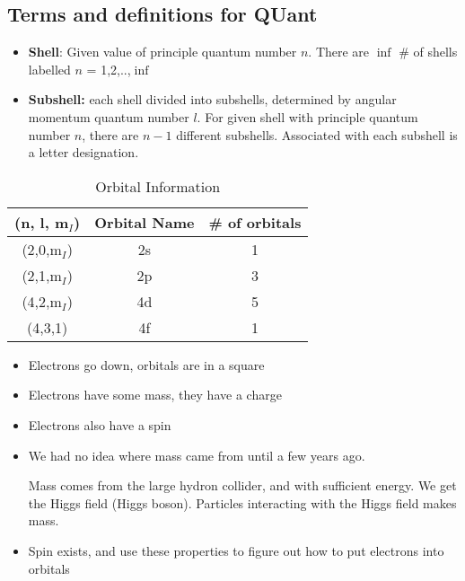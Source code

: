 \documentclass{article}
\begin{document}
\subsection{Terms and definitions for QUant}
\begin{itemize}
  \item \textbf{Shell}: Given value of principle quantum number $n$. There are $\inf{} $ \# of shells labelled $n$ = 1,2,..,$\inf{}$
  \item \textbf{Subshell:} each shell divided into subshells, determined by angular momentum quantum number $l$.
    For given shell with principle quantum number $n$, there are $n-1$ different subshells.
    Associated with each subshell is a letter designation.
\end{itemize}

\begin{table}[h]
    \centering
    \begin{tabular}{ccc}
        \textbf{(n, l, m$_I$)} & \textbf{Orbital Name} & \textbf{\# of orbitals} \\
        \hline
        (2,0,m$_I$) & 2s & 1 \\
        (2,1,m$_I$) & 2p & 3 \\
        (4,2,m$_I$) & 4d & 5 \\
        (4,3,1) & 4f & 1 \\
    \end{tabular}
    \caption{Orbital Information}
\end{table}

\begin{itemize}
  \item Electrons go down, orbitals are in a square
  \item Electrons have some mass, they have a charge
  \item Electrons also have a spin
  \item We had no idea where mass came from until a few years ago.

    Mass comes from the large hydron collider, and with sufficient energy.
    We get the Higgs field (Higgs boson). Particles interacting with the Higgs field makes mass.
  \item Spin exists, and use these properties to figure out how to put electrons into orbitals
\end{itemize}
\end{document}
